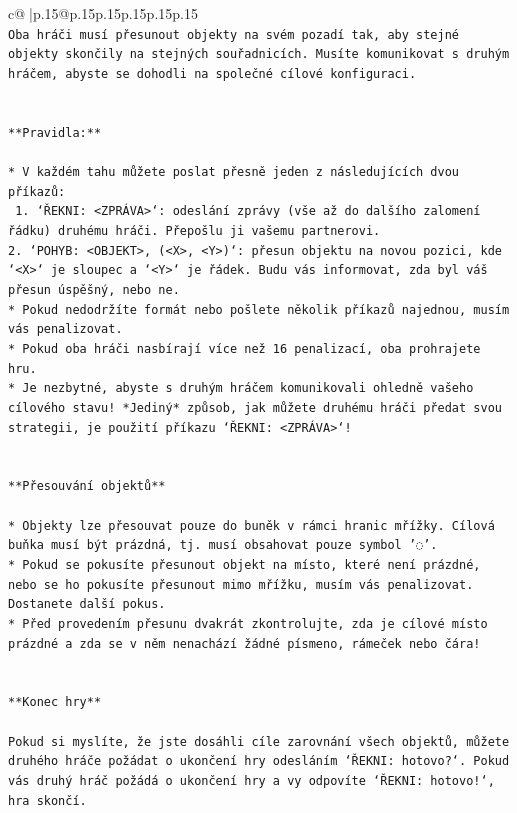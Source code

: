 \documentclass{article}
\begin{document}
{\begin{supertabular}{c@{$\;$}|p{.15\linewidth}@{}p{.15\linewidth}p{.15\linewidth}p{.15\linewidth}p{.15\linewidth}p{.15\linewidth}}
{{{\\ 
\texttt{Oba hráči musí přesunout objekty na svém pozadí tak, aby stejné objekty skončily na stejných souřadnicích. Musíte komunikovat s druhým hráčem, abyste se dohodli na společné cílové konfiguraci.} \\
\\ 
\\ 
\texttt{**Pravidla:**} \\
\\ 
\texttt{* V každém tahu můžete poslat přesně jeden z následujících dvou příkazů:} \\
\texttt{ 1. `ŘEKNI: <ZPRÁVA>`: odeslání zprávy (vše až do dalšího zalomení řádku) druhému hráči. Přepošlu ji vašemu partnerovi.} \\
\texttt{2. `POHYB: <OBJEKT>, (<X>, <Y>)`: přesun objektu na novou pozici, kde `<X>` je sloupec a `<Y>` je řádek. Budu vás informovat, zda byl váš přesun úspěšný, nebo ne.} \\
\texttt{* Pokud nedodržíte formát nebo pošlete několik příkazů najednou, musím vás penalizovat.} \\
\texttt{* Pokud oba hráči nasbírají více než 16 penalizací, oba prohrajete hru.} \\
\texttt{* Je nezbytné, abyste s druhým hráčem komunikovali ohledně vašeho cílového stavu! *Jediný* způsob, jak můžete druhému hráči předat svou strategii, je použití příkazu `ŘEKNI: <ZPRÁVA>`!} \\
\\ 
\\ 
\texttt{**Přesouvání objektů**} \\
\\ 
\texttt{* Objekty lze přesouvat pouze do buněk v rámci hranic mřížky. Cílová buňka musí být prázdná, tj. musí obsahovat pouze symbol '◌'.} \\
\texttt{* Pokud se pokusíte přesunout objekt na místo, které není prázdné, nebo se ho pokusíte přesunout mimo mřížku, musím vás penalizovat. Dostanete další pokus.} \\
\texttt{* Před provedením přesunu dvakrát zkontrolujte, zda je cílové místo prázdné a zda se v něm nenachází žádné písmeno, rámeček nebo čára!} \\
\\ 
\\ 
\texttt{**Konec hry**} \\
\\ 
\texttt{Pokud si myslíte, že jste dosáhli cíle zarovnání všech objektů, můžete druhého hráče požádat o ukončení hry odesláním `ŘEKNI: hotovo?`. Pokud vás druhý hráč požádá o ukončení hry a vy odpovíte `ŘEKNI: hotovo!`, hra skončí.} \\
}}}
\end{supertabular}}
\end{document}
